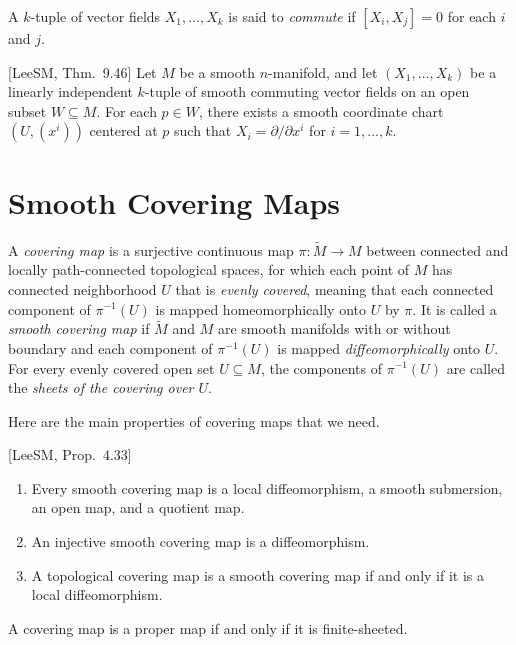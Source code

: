 A $k$-tuple of vector fields $X_1,\ldots,X_k$ is said to \emph{commute} if $[X_i, X_j] = 0$ for each $i$ and $j$.

\begin{proposition}
\label{prop:canonical-commuting-fields}
[LeeSM, Thm.~9.46] Let $M$ be a smooth $n$-manifold, and let $(X_1,\ldots,X_k)$ be a linearly independent $k$-tuple of smooth commuting vector fields on an open subset $W \subseteq M$. For each $p \in W$, there exists a smooth coordinate chart $(U, (x^i))$ centered at $p$ such that $X_i = \partial/\partial x^i$ for $i = 1,\ldots,k$.
\end{proposition}

\section{Smooth Covering Maps}

A \emph{covering map} is a surjective continuous map $\pi: \tilde{M} \to M$ between connected and locally path-connected topological spaces, for which each point of $M$ has connected neighborhood $U$ that is \emph{evenly covered}, meaning that each connected component of $\pi^{-1}(U)$ is mapped homeomorphically onto $U$ by $\pi$. It is called a \emph{smooth covering map} if $\tilde{M}$ and $M$ are smooth manifolds with or without boundary and each component of $\pi^{-1}(U)$ is mapped \emph{diffeomorphically} onto $U$. For every evenly covered open set $U \subseteq M$, the components of $\pi^{-1}(U)$ are called the \emph{sheets of the covering over $U$}.

Here are the main properties of covering maps that we need.

\begin{proposition}
\label{prop:elementary-covering-maps}
[LeeSM, Prop.~4.33]
\begin{enumerate}[label=(\alph*)]
\item Every smooth covering map is a local diffeomorphism, a smooth submersion, an open map, and a quotient map.
\item An injective smooth covering map is a diffeomorphism.
\item A topological covering map is a smooth covering map if and only if it is a local diffeomorphism.
\end{enumerate}
\end{proposition}

\begin{proposition}
\label{prop:covering-proper-finite-sheeted}
A covering map is a proper map if and only if it is finite-sheeted.
\end{proposition}

